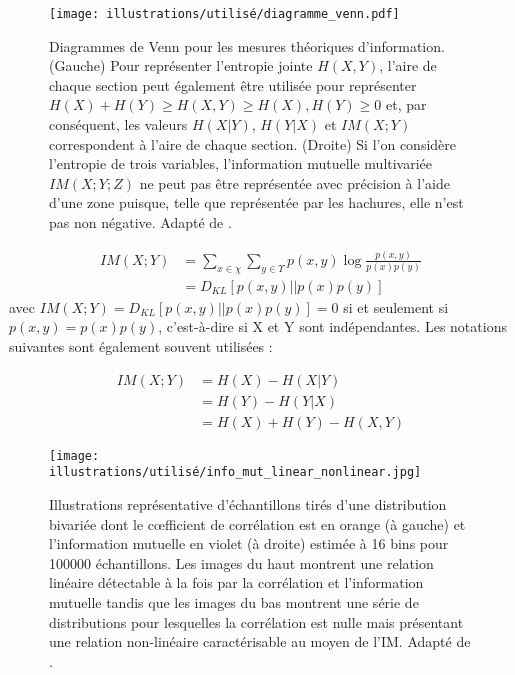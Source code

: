 \begin{figure*}[!t]
\center
\texttt{[image: illustrations/utilisé/diagramme\_venn.pdf]}
\caption[Diagrammes de Venn pour les mesures théoriques d'information]{Diagrammes de Venn pour les mesures théoriques d'information. (Gauche) Pour représenter l'entropie jointe $H(X,Y)$, l'aire de chaque section peut également être utilisée pour représenter $H(X) + H(Y) \geq H(X,Y) \geq H(X), H(Y) \geq 0$ et, par conséquent, les valeurs $H(X|Y)$, $H(Y|X)$ et $IM(X;Y)$ correspondent à l'aire de chaque section. (Droite) Si l'on considère l'entropie de trois variables, l'information mutuelle multivariée $IM(X;Y;Z)$ ne peut pas être représentée avec précision à l'aide d'une zone puisque, telle que représentée par les hachures, elle n'est pas non négative. Adapté de \cite{finn2020generalised}.}
\label{fig:chap3diagvenninfomut}
\end{figure*}

\begin{align}
IM(X;Y) &= \sum_{x \in \chi} \sum_{y \in \Upsilon} p(x,y) \log \frac{p(x,y)}{p(x)p(y)} \\
&= D_{KL}[p(x,y)||p(x)p(y)]
\end{align}
avec $IM(X;Y) = D_{KL}[p(x, y)||p(x)p(y)] = 0$ si et seulement si $p(x,y) = p(x)p(y)$, c'est-à-dire si X et Y sont indépendantes. 
Les notations suivantes sont également souvent utilisées :

\begin{align}
IM(X;Y) &= H(X) - H(X|Y ) \\
&= H(Y) - H(Y|X) \\
&= H (X) + H (Y) - H (X,Y)
\end{align}

\begin{figure*}[!t]
\center
\texttt{[image: illustrations/utilisé/info\_mut\_linear\_nonlinear.jpg]}
\caption[Corrélation et information mutuelle pour échantillons d'une distribution bivariée]{Illustrations représentative d'échantillons tirés d'une distribution bivariée dont le cœfficient de corrélation est en orange (à gauche) et l'information mutuelle en violet (à droite) estimée à 16 bins pour 100000 échantillons. Les images du haut montrent une relation linéaire détectable à la fois par la corrélation et l'information mutuelle tandis que les images du bas montrent une série de distributions pour lesquelles la corrélation est nulle mais présentant une relation non-linéaire caractérisable au moyen de l'IM. Adapté de \cite{ince2017statistical}.}
\label{fig:chap3infomutlinearnonlinear}
\end{figure*}

